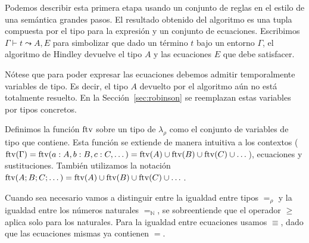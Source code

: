 Podemos describir esta primera etapa usando un conjunto de reglas en el estilo de una semántica grandes pasos. El resultado obtenido del algoritmo es una tupla compuesta por el tipo para la expresión y un conjunto de ecuaciones. Escribimos $\Gamma \vdash t \leadsto A, E$ para simbolizar que dado un término $t$ bajo un entorno $\Gamma$, el algoritmo de Hindley devuelve el tipo $A$ y las ecuaciones $E$ que debe satisfacer.

Nótese que para poder expresar las ecuaciones debemos admitir temporalmente variables de tipo. Es decir, el tipo $A$ devuelto por el algoritmo aún no está totalmente resuelto. En la Sección~\ref{sec:robinson} se reemplazan estas variables por tipos concretos. 

\begin{definicion}
    Definimos la función $\text{ftv}$ sobre un tipo de $\lambda_\rho$ como el conjunto de variables de tipo que contiene. Esta función se extiende de manera intuitiva a los contextos ($\text{ftv}(\Gamma)=\text{ftv}(a:A,b:B,c:C,\dots)=\text{ftv}(A)\cup\text{ftv}(B)\cup\text{ftv}(C)\cup\dots$), ecuaciones y sustituciones. También utilizamos la notación $\text{ftv}(A;B;C;\dots) = \text{ftv}(A)\cup\text{ftv}(B)\cup\text{ftv}(C)\cup\dots$.
\end{definicion}

Cuando sea necesario vamos a distinguir entre la igualdad entre tipos $=_\rho$ y la igualdad entre los números naturales $=_\mathbb{N}$, se sobreentiende que el operador $\geq$ aplica solo para los naturales. Para la igualdad entre ecuaciones usamos $\equiv$, dado que las ecuaciones mismas ya contienen $=$.

